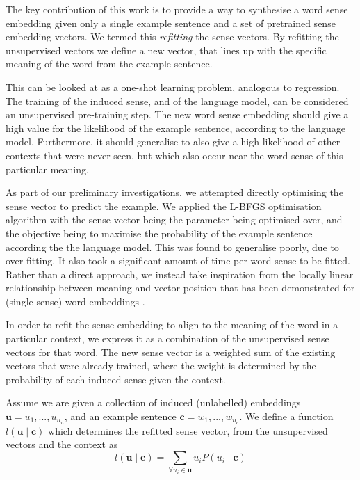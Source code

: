 \documentclass{sig-alternate}
\renewcommand{\c}{\mathbf{c}}
\renewcommand{\u}{\mathbf{u}}
\begin{document}
The key contribution of this work is to provide a way to synthesise a word sense embedding given only a single example sentence and a set of pretrained sense embedding vectors. 
We termed this \emph{refitting} the sense vectors.
By refitting the unsupervised vectors we define a new vector, that lines up with the specific meaning of the word from the example sentence.

This can be looked at as a one-shot learning problem, analogous to regression.
The training of the induced sense, and of the language model, can be considered an unsupervised pre-training step. The new word sense embedding should give a high value for the likelihood of the example sentence, according to the language model. Furthermore, it should generalise to also give a high likelihood of other contexts that were never seen, but which also occur near the word sense of this particular meaning.

As part of our preliminary investigations, we attempted directly optimising the sense vector to predict the example.
We applied the L-BFGS \parencite{nocedal1980updating} optimisation algorithm with the sense vector being the parameter being optimised over, and the objective being to maximise the probability of the example sentence according the the language model.
This was found to generalise poorly, due to over-fitting.
It also took a significant amount of time per word sense to be fitted.
Rather than a direct approach, we instead take inspiration from the locally linear relationship between meaning and vector position that has been demonstrated for (single sense) word embeddings \parencite{mikolov2013efficient,mikolovSkip,mikolov2013linguisticsubstructures}.

In order to refit the sense embedding to align to the meaning of the word in a particular context, we express it as a combination of the unsupervised sense vectors for that word.
The new sense vector is a weighted sum of the existing vectors that were already trained, where the weight is determined by the probability of each induced sense given the context.


Assume we are given a collection of induced (unlabelled) embeddings $\u={u_1,...,u_{n_u}}$, and an example sentence $\c={w_1,...,w_{n_c}}$. We define a function $l(\u \mid \c )$ which determines the refitted sense vector, from the unsupervised vectors and the context as
\begin{equation} \label{eq:synth}
l(\u \mid \c ) = \sum_{\forall u_i \in \u} u_i P(u_i \mid \c)
\end{equation}
\end{document}

